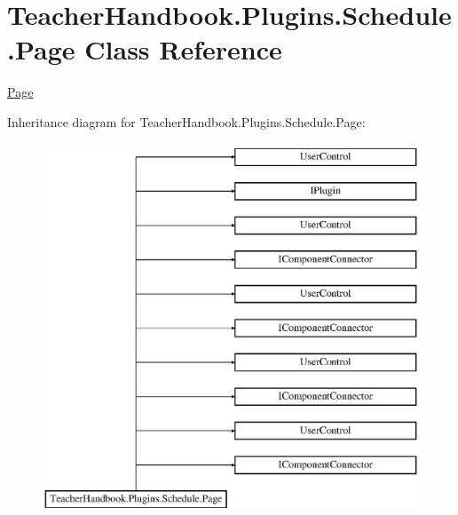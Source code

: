 \hypertarget{class_teacher_handbook_1_1_plugins_1_1_schedule_1_1_page}{}\section{Teacher\+Handbook.\+Plugins.\+Schedule.\+Page Class Reference}
\label{class_teacher_handbook_1_1_plugins_1_1_schedule_1_1_page}


\mbox{\hyperlink{class_teacher_handbook_1_1_plugins_1_1_schedule_1_1_page}{Page}}  


Inheritance diagram for Teacher\+Handbook.\+Plugins.\+Schedule.\+Page\+:\begin{figure}[H]
\begin{center}
\leavevmode
\includegraphics[height=11.000000cm]{df/db4/class_teacher_handbook_1_1_plugins_1_1_schedule_1_1_page}
\end{center}
\end{figure}
